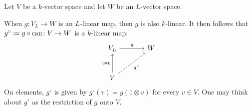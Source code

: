 \begin{fluff}
  Let $V$ be a $k$-vector space and let $W$ be an $L$-vector space.
  
  When $g \colon V_L \to W$ is an $L$-linear map, then $g$ is also $k$-linear.
  It then follows that $g^\circ \coloneqq g \circ \operatorname{can} \colon V \to W$ is a $k$-linear map:
  \[
    \begin{tikzcd}[sep = large]
        V_L
        \arrow{r}[above]{g}
      & W
      \\
        V
        \arrow{u}[left]{\can}
        \arrow[dashed]{ru}[below right]{g^\circ}
      & {}
    \end{tikzcd}
  \]
  On elements, $g^\circ$ is given by $g^\circ(v) = g(1 \otimes v)$ for every $v \in V$.
  One may think about $g^\circ$ as the restriction of $g$ onto $V$.
  

\end{fluff}
